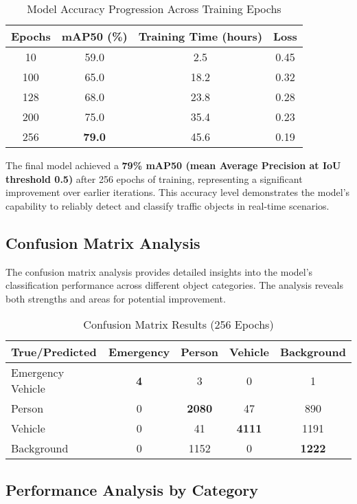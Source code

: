 \begin{table}[h]
\centering
\caption{Model Accuracy Progression Across Training Epochs}
\label{tab:model_accuracy}
\begin{tabular}{|c|c|c|c|}
\hline
\textbf{Epochs} & \textbf{mAP50 (\%)} & \textbf{Training Time (hours)} & \textbf{Loss} \\
\hline
10 & 59.0 & 2.5 & 0.45 \\
100 & 65.0 & 18.2 & 0.32 \\
128 & 68.0 & 23.8 & 0.28 \\
200 & 75.0 & 35.4 & 0.23 \\
256 & \textbf{79.0} & 45.6 & 0.19 \\
\hline
\end{tabular}
\end{table}

The final model achieved a \textbf{79\% mAP50 (mean Average Precision at IoU threshold 0.5)} after 256 epochs of training, representing a significant improvement over earlier iterations. This accuracy level demonstrates the model's capability to reliably detect and classify traffic objects in real-time scenarios.

\subsection{Confusion Matrix Analysis}
The confusion matrix analysis provides detailed insights into the model's classification performance across different object categories. The analysis reveals both strengths and areas for potential improvement.

\begin{table}[h]
\centering
\caption{Confusion Matrix Results (256 Epochs)}
\label{tab:confusion_matrix}
\begin{tabular}{|l|c|c|c|c|}
\hline
\textbf{True/Predicted} & \textbf{Emergency} & \textbf{Person} & \textbf{Vehicle} & \textbf{Background} \\
\hline
Emergency Vehicle & \textbf{4} & 3 & 0 & 1 \\
Person & 0 & \textbf{2080} & 47 & 890 \\
Vehicle & 0 & 41 & \textbf{4111} & 1191 \\
Background & 0 & 1152 & 0 & \textbf{1222} \\
\hline
\end{tabular}
\end{table}

\subsection{Performance Analysis by Category}

